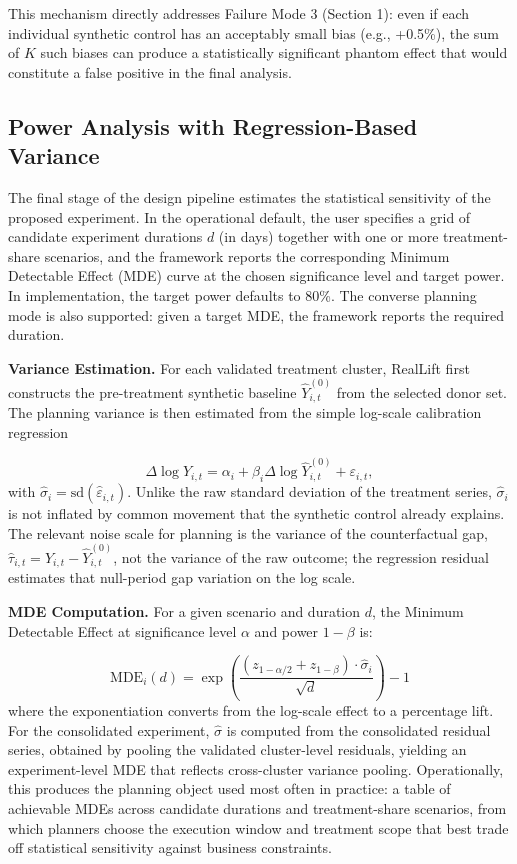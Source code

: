 \documentclass[11pt]{article}
\begin{document}
This mechanism directly addresses Failure Mode 3 (Section 1): even if each individual synthetic control has an acceptably small bias (e.g., +0.5\%), the sum of $K$ such biases can produce a statistically significant phantom effect that would constitute a false positive in the final analysis.

\subsection{Power Analysis with Regression-Based Variance}
The final stage of the design pipeline estimates the statistical sensitivity of the proposed experiment. In the operational default, the user specifies a grid of candidate experiment durations $d$ (in days) together with one or more treatment-share scenarios, and the framework reports the corresponding Minimum Detectable Effect (MDE) curve at the chosen significance level and target power. In implementation, the target power defaults to 80\%. The converse planning mode is also supported: given a target MDE, the framework reports the required duration.

\textbf{Variance Estimation.} For each validated treatment cluster, RealLift first constructs the pre-treatment synthetic baseline $\hat{Y}_{i,t}^{(0)}$ from the selected donor set. The planning variance is then estimated from the simple log-scale calibration regression

\[
\Delta \log Y_{i,t} = \alpha_i + \beta_i \Delta \log \hat{Y}_{i,t}^{(0)} + \varepsilon_{i,t},
\]
with $\hat{\sigma}_i = \mathrm{sd}(\hat{\varepsilon}_{i,t})$. Unlike the raw standard deviation of the treatment series, $\hat{\sigma}_i$ is not inflated by common movement that the synthetic control already explains. The relevant noise scale for planning is the variance of the counterfactual gap, $\hat{\tau}_{i,t} = Y_{i,t} - \hat{Y}_{i,t}^{(0)}$, not the variance of the raw outcome; the regression residual estimates that null-period gap variation on the log scale.

\textbf{MDE Computation.} For a given scenario and duration $d$, the Minimum Detectable Effect at significance level $\alpha$ and power $1 - \beta$ is:

\[
\text{MDE}_i(d) = \exp\left( \frac{(z_{1-\alpha/2} + z_{1-\beta}) \cdot \hat{\sigma}_i}{\sqrt{d}} \right) - 1
\]
where the exponentiation converts from the log-scale effect to a percentage lift. For the consolidated experiment, $\hat{\sigma}$ is computed from the consolidated residual series, obtained by pooling the validated cluster-level residuals, yielding an experiment-level MDE that reflects cross-cluster variance pooling. Operationally, this produces the planning object used most often in practice: a table of achievable MDEs across candidate durations and treatment-share scenarios, from which planners choose the execution window and treatment scope that best trade off statistical sensitivity against business constraints.
\end{document}

